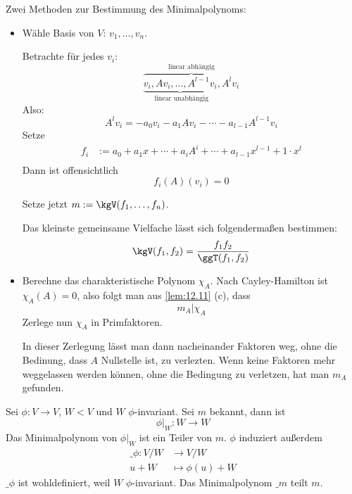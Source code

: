\documentclass{mycourse}
\begin{document}
\begin{note}
	Zwei Methoden zur Bestimmung des Minimalpolynoms:
	\begin{itemize}
		\item
			Wähle Basis von $V$: $v_1,\dotsc,v_n$.

			Betrachte für jedes $v_i$:
			\[
				\overbrace{\underbrace{v_i, Av_i, \dotsc, A^{l-1}v_i}_{\text{ linear unabhängig}}, A^lv_i}^{\text{linear abhängig}}
			\]
			Also:
			\[
				A^lv_i = -a_0v_i - a_1Av_i - \dotsb - a_{l-1}A^{l-1}v_i
			\]
			Setze
			\begin{align*}
				f_i &:= a_0 + a_1x+\dotsb +a_{i}A^i+ \dotsb + a_{l-1}x^{l-1}+1\cdot x^l\\
			\end{align*}
			Dann ist offensichtlich
			\[ 
				f_i(A)(v_i) = 0
			\]

			Setze jetzt $m:= \kgV(f_1,\dotsc, f_n)$.
			\begin{note}
				Das kleinste gemeinsame Vielfache lässt sich folgendermaßen bestimmen:
				\[
					\kgV(f_1,f_2) = \frac {f_1f_2}{\ggT(f_1,f_2)}
				\]
			\end{note}
		\item
			Berechne das charakteristische Polynom $\chi_A$.
			Nach Cayley-Hamilton ist $\chi_A(A)=0$, also folgt man aus \ref{lem:12.11} (c), dass
			\[
				m_A | \chi_A
			\]
			Zerlege nun $\chi_A$ in Primfaktoren.
			
			In dieser Zerlegung lässt man dann nacheinander Faktoren weg, ohne die Bedinung, dass $A$ Nullstelle ist, zu verlezten.
			Wenn keine Faktoren mehr weggelassen werden können, ohne die Bedingung zu verletzen, hat man $m_A$ gefunden.
	\end{itemize}
\end{note}

Sei $\phi: V\to V$, $W<V$ und $W$ $\phi$-invariant.
Sei $m$ bekannt, dann ist
\[
	\phi|_W : W\to W
\]
Das Minimalpolynom von $\phi|_W$ ist ein Teiler von $m$.
$\phi$ induziert außerdem
\begin{align*}
	\_\phi: V/W &\to V/W\\
	u+W &\mapsto \phi(u)+W
\end{align*}
$\_\phi$ ist wohldefiniert, weil $W$ $\phi$-invariant.
Das Minimalpolynom $\_m$ teilt $m$.
\end{document}
